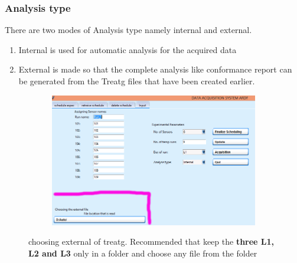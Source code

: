 \documentclass[12pt]{article}
\begin{document}
    
    
    
    \subsubsection{Analysis type}
    There are two modes of Analysis type namely internal and external.
    \begin{enumerate}
        \item Internal is used for automatic analysis for the acquired data
        \item External is made so that the complete analysis like conformance report can be generated from the Treatg files that have been created earlier.
    \end{enumerate}
   
   \begin{figure}[H]
 
    \begin{subfigure}{1.0\textwidth}
    \includegraphics[scale=0.5]{images/choosing_external.png} 
    \label{fig:DJp1}
    \end{subfigure}
 
 \caption{choosing external of treatg. Recommended that keep the \textbf{three L1, L2  and L3} only in a folder and choose any file from the folder}
\label{fig6}
\end{figure}
   
   
   
   
   
   
   
   
   
\end{document}
